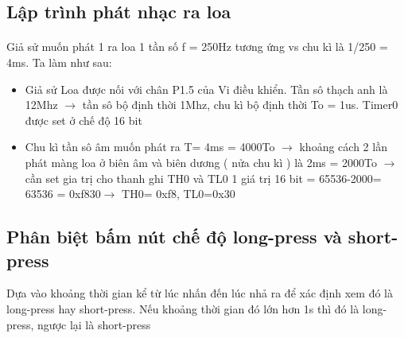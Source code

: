 \documentclass[../report.tex]{subfiles}
\begin{document}
\subsection{Lập trình phát nhạc ra loa}
\paragraph*{}Giả sử muốn phát 1 ra loa 1 tần số f = 250Hz  tương ứng vs chu kì  là 1/250 = 4ms. Ta làm như sau:
    \begin{itemize}
        \item  Giả sử Loa được nối với chân P1.5 của Vi điều khiển.  Tần sô thạch anh là 12Mhz $\rightarrow$ tần sô bộ định thời 1Mhz, chu kì bộ định thời To = 1us. Timer0 được set ở chế độ 16 bit
        \item  Chu kì tần sô âm muốn phát ra T= 4ms = 4000To $\rightarrow$ khoảng cách  2 lần phát màng loa ở biên âm và biên dương ( nửa chu kì ) là 2ms = 2000To $\rightarrow$ cần set gia trị cho thanh ghi TH0 và TL0 1 giá trị 16 bit = 65536-2000= 63536 = 0xf830$\rightarrow$ TH0= 0xf8, TL0=0x30

    \end{itemize}

\subsection{Phân biệt bấm nút chế độ long-press và short-press}
Dựa vào khoảng thời gian kể từ lúc nhấn đến lúc nhả ra để xác định xem đó là long-press hay short-press. Nếu khoảng thời gian đó lớn hơn 1s thì đó là long-press, ngược lại là short-press
\end{document}
